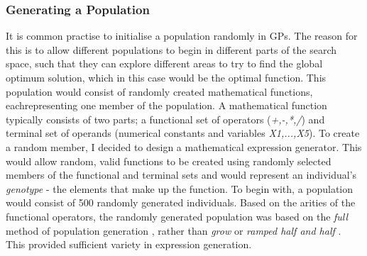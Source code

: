 \documentclass[11pt]{article}
\begin{document}
\subsubsection{Generating a Population}\label{subsubsec:genPo}
It is common practise to initialise a population randomly in GPs. The reason for this is to allow different populations to begin in different parts of the search space, such that they can explore different areas to try to find the global optimum solution, which in this case would be the optimal function.  This population would consist of randomly created mathematical functions, eachrepresenting one member of the population. A mathematical function typically consists of two parts; a functional set of operators (\textit{+,-,*,/}) and terminal set of operands (numerical constants and variables \textit{X1,...,X5}). To create a random member, I decided to design a mathematical expression generator. This would allow random, valid functions to be created using randomly selected members of the functional and terminal sets and would represent an individual's \textit{genotype} - the elements that make up the function. To begin with, a population would consist of 500 randomly generated individuals. Based on the arities of the functional operators, the randomly generated population was based on the \textit{full} method of population generation \cite{ref-book}, rather than \textit{grow} or \textit{ramped half and half} \cite{ref-koz}. This provided sufficient variety in expression generation.
\end{document}
